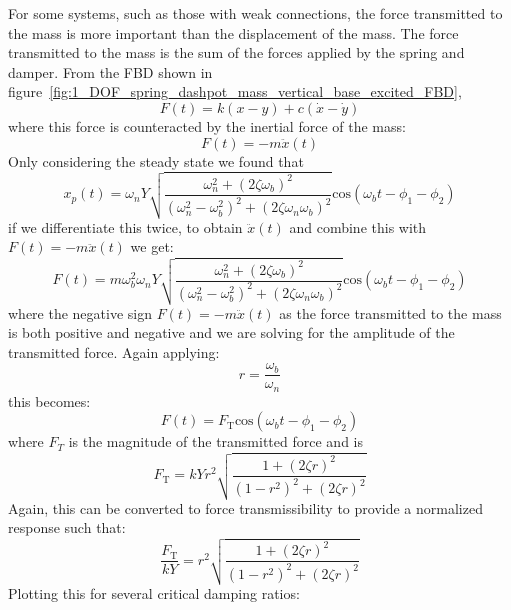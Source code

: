 \documentclass[12pt,letter]{article}
\begin{document}
		For some systems, such as those with weak connections, the force transmitted to the mass is more important than the displacement of the mass. The force transmitted to the mass is the sum of the forces applied by the spring and damper. From the FBD shown in figure~\ref{fig:1_DOF_spring_dashpot_mass_vertical_base_excited_FBD},
		\begin{equation}
		F(t) = k(x-y) + c(\dot{x} - \dot{y}) 
		\end{equation}
		where this force is counteracted by the inertial force of the mass:
		\begin{equation}
		F(t) = -m\ddot{x}(t)
		\end{equation}
		Only considering the steady state we found that 
		\begin{equation}
			x_p(t) = 	\omega_n Y   \sqrt{\frac{\omega_n^2 + (2 \zeta \omega_b)^2 }{(\omega_n^2 - \omega_b^2)^2 +  (2\zeta \omega_n \omega_b)^2} }  \text{cos}(\omega_bt - \phi_1 - \phi_2)
		\end{equation} 
		if we differentiate this twice, to obtain $\ddot{x}(t)$ and combine this with $F(t) = -m\ddot{x}(t)$ we get:
		\begin{equation}
			F(t) = 	m \omega_b^2 \omega_n Y   \sqrt{\frac{\omega_n^2 + (2 \zeta \omega_b)^2 }{(\omega_n^2 - \omega_b^2)^2 +  (2\zeta \omega_n \omega_b)^2} }  \text{cos}(\omega_bt - \phi_1 - \phi_2)
		\end{equation} 
		where the negative sign $F(t) = -m\ddot{x}(t)$ as the force transmitted to the mass is both positive and negative and we are solving for the amplitude of the transmitted force. Again applying:
		\begin{equation}
			r=\frac{\omega_b}{\omega_n}
		\end{equation} 
		this becomes:
		\begin{equation}
			F(t) = 	F_\text{T} \text{cos}(\omega_bt - \phi_1 - \phi_2)
		\end{equation} 
		where $F_T$ is the magnitude of the transmitted force and is 
		\begin{equation}
			F_\text{T} = kYr^2 \sqrt{\frac{1+(2 \zeta r)^2}{(1-r^2)^2 + (2 \zeta r )^2}} 
		\end{equation}
		Again, this can be converted to force transmissibility to provide a normalized response such that:
		\begin{equation}
			\frac{F_\text{T}}{kY} = r^2 \sqrt{\frac{1+(2 \zeta r)^2}{(1-r^2)^2 + (2 \zeta r )^2}} 
		\end{equation}
		Plotting this for several critical damping ratios:
\end{document}
